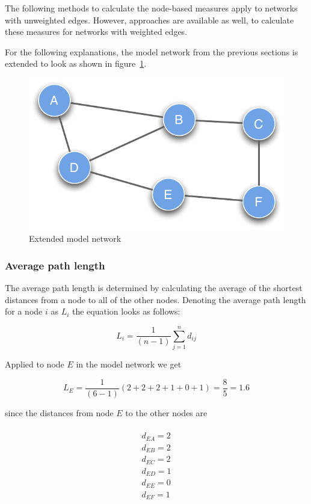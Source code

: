 The following methods to calculate the node-based measures apply to networks with unweighted edges. However, approaches are available as well, to calculate these measures for networks with weighted edges\citep{bocaletti:06}. 

For the following explanations, the model network from the previous sections is extended to look as shown in figure~\ref{fig:extended_network}.

\clearpage

\begin{figure}[h!tpb]
\begin{center}
  \includegraphics[width=.45\textwidth]{assets/pdf/graph_undirected_node_based.pdf}
  \caption{Extended model network}
  \label{fig:extended_network}
\end{center}
\end{figure}   


\subsubsection{Average path length}

The average path length is determined by calculating the average of the shortest distances from a node to all of the other nodes. Denoting the average path length for a node $i$ as $L_i$ the equation looks as follows:

\begin{equation}
L_i = \frac{1}{(n-1)}\sum^n_{j=1} d_{ij}
\label{eq:average_path_lenght}
\end{equation}

Applied to node $E$ in the model network we get

\begin{equation}
L_E = \frac{1}{(6-1)}(2 + 2 + 2 + 1 + 0 + 1) = \frac{8}{5} = 1.6
\label{eq:average_path_lenght_e}
\end{equation}

since the distances from node $E$ to the other nodes are

\begin{multline} 
\\d_{EA} = 2 \\
d_{EB} = 2 \\
d_{EC} = 2 \\
d_{ED} = 1 \\
d_{EE} = 0 \\
d_{EF} = 1 \\
\label{eq:distances_e}
\end{multline}

